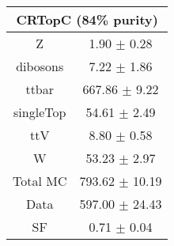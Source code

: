 \begin{tabular}{c|c}
\hline\hline
\multicolumn{2}{c}{\bf CRTopC (84\% purity)} \\ \hline 
Z & 1.90 $\pm$ 0.28 \\
dibosons & 7.22 $\pm$ 1.86 \\
ttbar & 667.86 $\pm$ 9.22 \\
singleTop & 54.61 $\pm$ 2.49 \\
ttV & 8.80 $\pm$ 0.58 \\
W & 53.23 $\pm$ 2.97 \\
\hline
Total MC & 793.62 $\pm$ 10.19 \\
Data & 597.00 $\pm$ 24.43 \\
 \hline
SF & 0.71 $\pm$ 0.04 \\
\hline\hline
\end{tabular}

